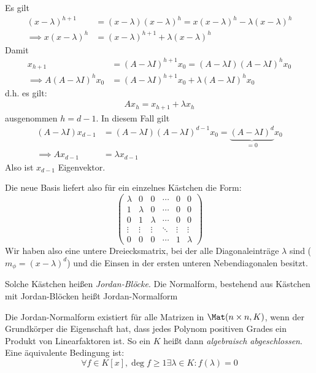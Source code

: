 \documentclass{mycourse}
\begin{document}
Es gilt
\begin{align*}
	(x-\lambda)^{h+1} &=  (x-\lambda)(x-\lambda)^h = x(x-\lambda)^h -\lambda(x-\lambda)^h\\
	\implies x(x-\lambda)^h &= (x-\lambda)^{h+1} + \lambda(x-\lambda)^h
\end{align*}
Damit
\begin{align*}
	x_{h+1} &= (A-\lambda I)^{h+1} x_0 = (A-\lambda I)(A-\lambda I)^h x_0\\
	\implies A(A-\lambda I)^hx_0 &= (A-\lambda I)^{h+1}x_0 + \lambda (A-\lambda I)^h x_0
\end{align*}
d.h. es gilt:
\begin{align*}
	A x_h = x_{h+1} + \lambda x_h
\end{align*}
ausgenommen $h=d-1$.
In diesem Fall gilt
\begin{align*}
	(A-\lambda I)x_{d-1} &= (A-\lambda I)(A-\lambda I)^{d-1} x_0 = \underbrace{(A-\lambda I)^d}_{=0} x_0\\
	\implies Ax_{d-1} &= \lambda x_{d-1}
\end{align*}
Also ist $x_{d-1}$ Eigenvektor.

Die neue Basis liefert also für ein einzelnes Kästchen die Form:
\[
	\begin{pmatrix}
		\lambda & 0 & 0 & \cdots & 0 &0\\
		1 & \lambda & 0 & \cdots & 0 & 0\\
		0 & 1 & \lambda & \cdots & 0 &0\\
		\vdots & \vdots & \vdots & \ddots & \vdots &\vdots \\
		0 & 0 & 0 & \cdots & 1 & \lambda
	\end{pmatrix}
\]
Wir haben also eine untere Dreiecksmatrix, bei der alle Diagonaleinträge $\lambda$ sind ($m_\phi = (x-\lambda)^d$) und die Einsen in der ersten unteren Nebendiagonalen besitzt.

\begin{df}
	\label{df:12.19}
	Solche Kästchen heißen \emph{Jordan-Blöcke}.
	Die Normalform, bestehend aus Kästchen mit Jordan-Blöcken heißt Jordan-Normalform
\end{df}

Die Jordan-Normalform existiert für alle Matrizen in $\Mat(n\times n, K)$, wenn der Grundkörper die Eigenschaft hat, dass jedes Polynom positiven Grades ein Produkt von Linearfaktoren ist.
So ein $K$ heißt dann \emph{algebraisch abgeschlossen}.
Eine äquivalente Bedingung ist:
\[
	\forall f\in K[x], \deg f \ge 1  \exists \lambda \in K :f(\lambda) = 0
\]
\end{document}
